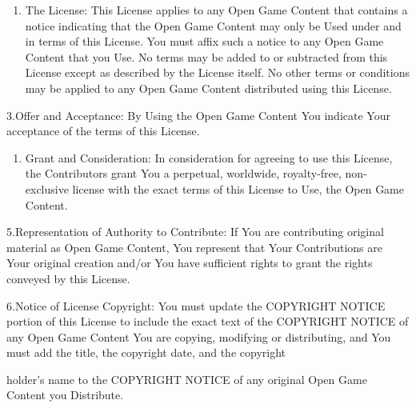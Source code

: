 \begin{multicols}{2}
\begin{enumerate}
\def\labelenumi{\arabic{enumi}.}
\setcounter{enumi}{1}
\item
  The License: This License applies to any Open Game Content that
  contains a notice indicating that the Open Game Content may only be
  Used under and in terms of this License. You must affix such a notice
  to any Open Game Content that you Use. No terms may be added to or
  subtracted from this License except as described by the License
  itself. No other terms or conditions may be applied to any Open Game
  Content distributed using this License.
\end{enumerate}


3.Offer and Acceptance: By Using the Open Game Content You indicate Your
acceptance of the terms of this License.


\begin{enumerate}
\def\labelenumi{\arabic{enumi}.}
\setcounter{enumi}{3}
\item
  Grant and Consideration: In consideration for agreeing to use this
  License, the Contributors grant You a perpetual, worldwide,
  royalty-free, non-exclusive license with the exact terms of this
  License to Use, the Open Game Content.
\end{enumerate}


5.Representation of Authority to Contribute: If You are contributing
original material as Open Game Content, You represent that Your
Contributions are Your original creation and/or You have sufficient
rights to grant the rights conveyed by this License.

6.Notice of License Copyright: You must update the COPYRIGHT NOTICE
portion of this License to include the exact text of the COPYRIGHT
NOTICE of any Open Game Content You are copying, modifying or
distributing, and You must add the title, the copyright date, and the
copyright

holder's name to the COPYRIGHT NOTICE of any original Open Game Content
you Distribute.



\end{multicols}

